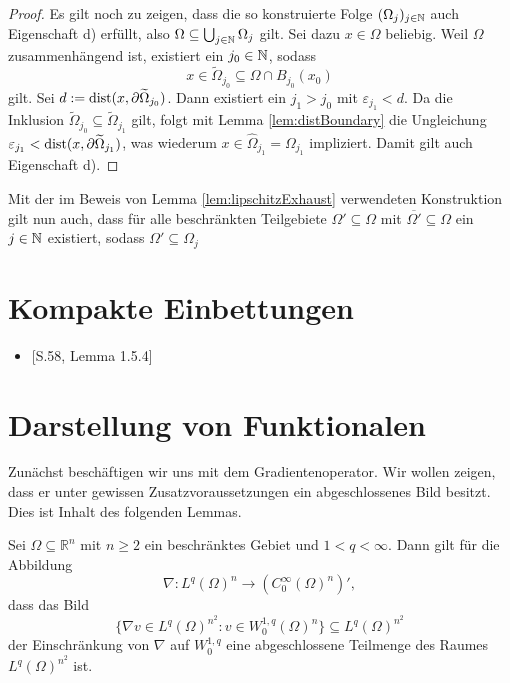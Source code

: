 \begin{proof}
  Es gilt noch zu zeigen, dass die so konstruierte Folge $(\Omega_j)_{j \in \mathbb{N}}$ auch Eigenschaft d) erfüllt, also $ \Omega \subseteq \bigcup_{j \in \mathbb{N}} \Omega_j $ gilt.
  Sei dazu $x \in \Omega$ beliebig.
  Weil $\Omega$ zusammenhängend ist, existiert ein $j_0 \in \mathbb{N}$, sodass
  $$
  x \in \widetilde\Omega_{j_0} \subseteq \Omega \cap B_{j_0}(x_0)
  $$
  gilt.
  Sei $d:=\operatorname{dist}(x, \partial\widetilde\Omega_{j_0})$.
  Dann existiert ein $j_1 > j_0$ mit $\varepsilon_{j_1} < d$.
  Da die Inklusion $\widetilde\Omega_{j_0} \subseteq \widetilde\Omega_{j_1}$ gilt, folgt mit Lemma \ref{lem:distBoundary} die Ungleichung $\varepsilon_{j_1} < \operatorname{dist}(x,\partial\widetilde\Omega_{j_1})$, was wiederum $x \in \widehat\Omega_{j_1} = \Omega_{j_1}$ impliziert.
  Damit gilt auch Eigenschaft d).
\end{proof}

\begin{bemnumber}
  \label{bem:boundedSubset}
  Mit der im Beweis von Lemma \ref{lem:lipschitzExhaust} verwendeten Konstruktion gilt nun auch, dass für alle beschränkten Teilgebiete $\Omega' \subseteq \Omega$ mit $\overline{\Omega'} \subseteq \Omega$ ein $j \in \mathbb{N}$ existiert, sodass $\Omega' \subseteq \Omega_j$
\end{bemnumber}

\section{Kompakte Einbettungen}

\begin{itemize}
  \item \cite{sohr2001navier}[S.58, Lemma 1.5.4]
\end{itemize}

\begin{lem}
  \label{lem:compactEmbedding}
\end{lem}

\section{Darstellung von Funktionalen}

Zunächst beschäftigen wir uns mit dem Gradientenoperator.
Wir wollen zeigen, dass er unter gewissen Zusatzvoraussetzungen ein abgeschlossenes Bild besitzt.
Dies ist Inhalt des folgenden Lemmas.

\begin{lem}
  \label{lem:closedImageGradient}
  Sei $\Omega \subseteq \mathbb{R}^n$ mit $n \geq 2$ ein beschränktes Gebiet und $1 < q < \infty$.
  Dann gilt für die Abbildung
  $$
  \nabla \colon L^{q}(\Omega)^{n} \to (C_0^\infty(\Omega)^n)',
  $$
  dass das Bild
  $$
  \{\nabla v \in L^{q}(\Omega)^{n^2} \colon v \in W_0^{1,q}(\Omega)^n\} \subseteq L^{q}(\Omega)^{n^2}
  $$
  der Einschränkung von $\nabla$ auf $W_0^{1,q}$ eine abgeschlossene Teilmenge des Raumes $L^q(\Omega)^{n^2}$ ist.
\end{lem}

